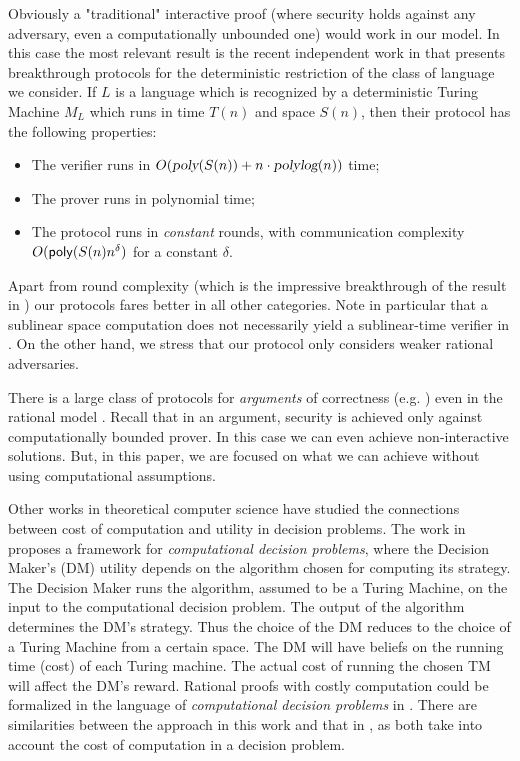 {\medskip
{}
Obviously a "traditional" interactive proof (where security holds against any adversary, even a computationally unbounded one) would work in our model. In this case the most relevant result is 
the recent independent work in \cite{rrr16} that presents breakthrough protocols for the deterministic restriction of the class of language we consider. If $L$ is a language which is recognized by a deterministic Turing Machine $M_L$ which runs in time $T(n)$ and space $S(n)$, then their protocol has the following properties: 
\begin{itemize}
\item The verifier runs in 
$O({\textsl{poly}}(S(n)) + n \cdot{\ensuremath{\textsl{polylog}}}(n))$ time;
\item The prover runs in polynomial time;
\item The protocol runs in {\em constant} rounds, with communication complexity $O({\sf poly}(S(n)n^{\delta})$ for a constant $\delta$.
\end{itemize}
Apart from round complexity (which is the impressive breakthrough of the result in \cite{rrr16}) our protocols fares better in all other categories. Note in particular that a sublinear space computation does not necessarily yield a sublinear-time verifier in 
\cite{rrr16}. On the other hand, we stress that our protocol only considers weaker rational adversaries. 

\medskip
{}
There is a large class of protocols for {\em arguments} of correctness (e.g. \cite{ggp10,ggpr13,krr14}) even in the rational model \cite{ratargs,ratsumchecks}. Recall that in an argument, security is achieved only against computationally bounded prover. In this case we can even achieve non-interactive solutions. But, in this paper, we are focused on what we can achieve without using computational assumptions.

Other works in theoretical computer science have studied the connections between cost of computation and utility in decision problems.
The work in \cite{halpern2011don} proposes a framework for \emph{computational decision problems}, where the Decision Maker's (DM) utility depends on the algorithm chosen for computing its strategy.
The Decision Maker runs the algorithm, assumed to be a Turing Machine, on the input to the computational decision problem.
The output of the algorithm determines the DM's strategy. 
Thus the choice of the DM reduces to the choice of a Turing Machine from a certain space. The DM will have beliefs on the running time (cost) of each Turing machine. The actual cost of running the chosen TM will affect the DM's reward.
Rational proofs with costly computation could be formalized in the language of \emph{computational decision problems} in \cite{halpern2011don}. There are similarities between the approach in this
work and that in \cite{halpern2011don}, as both take into account the cost of computation in a decision problem.

}
